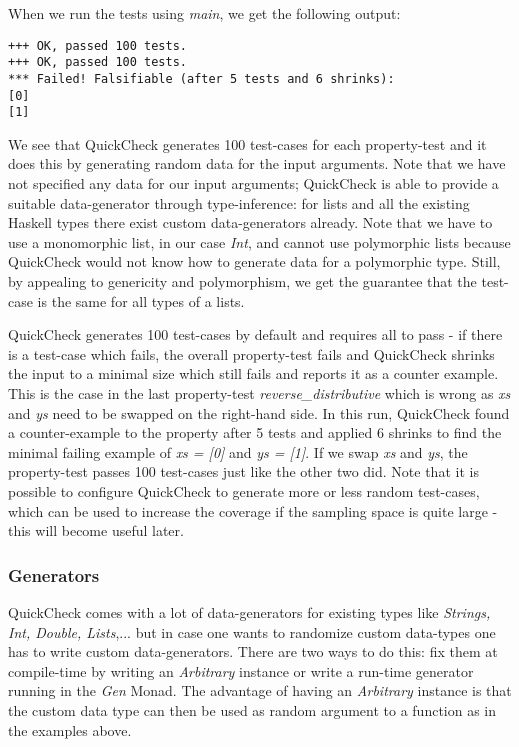When we run the tests using \textit{main}, we get the following output:

\begin{verbatim}
+++ OK, passed 100 tests.
+++ OK, passed 100 tests.
*** Failed! Falsifiable (after 5 tests and 6 shrinks):    
[0]
[1]
\end{verbatim}

We see that QuickCheck generates 100 test-cases for each property-test and it does this by generating random data for the input arguments. Note that we have not specified any data for our input arguments; QuickCheck is able to provide a suitable data-generator through type-inference: for lists and all the existing Haskell types there exist custom data-generators already. Note that we have to use a monomorphic list, in our case \textit{Int}, and cannot use polymorphic lists because QuickCheck would not know how to generate data for a polymorphic type. Still, by appealing to genericity and polymorphism, we get the guarantee that the test-case is the same for all types of a lists.

QuickCheck generates 100 test-cases by default and requires all to pass - if there is a test-case which fails, the overall property-test fails and QuickCheck shrinks the input to a minimal size which still fails and reports it as a counter example. This is the case in the last property-test \textit{reverse\_distributive} which is wrong as \textit{xs} and \textit{ys} need to be swapped on the right-hand side. In this run, QuickCheck found a counter-example to the property after 5 tests and applied 6 shrinks to find the minimal failing example of \textit{xs = [0]} and \textit{ys = [1]}. If we swap \textit{xs} and \textit{ys}, the property-test passes 100 test-cases just like the other two did. Note that it is possible to configure QuickCheck to generate more or less random test-cases, which can be used to increase the coverage if the sampling space is quite large - this will become useful later.

\subsubsection*{Generators}
QuickCheck comes with a lot of data-generators for existing types like \textit{Strings, Int, Double, Lists},... but in case one wants to randomize custom data-types one has to write custom data-generators. There are two ways to do this: fix them at compile-time by writing an \textit{Arbitrary} instance or write a run-time generator running in the \textit{Gen} Monad. The advantage of having an \textit{Arbitrary} instance is that the custom data type can then be used as random argument to a function as in the examples above.

